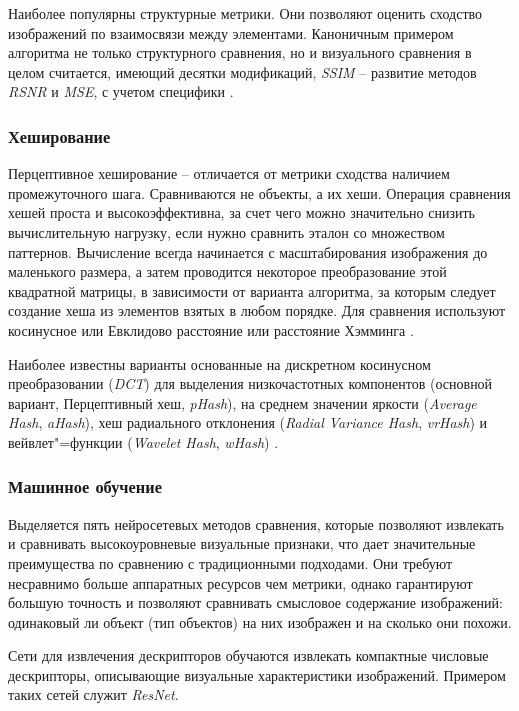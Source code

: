 Наиболее популярны структурные метрики. Они позволяют оценить сходство
изображений по взаимосвязи между элементами. Каноничным примером алгоритма не
только структурного сравнения, но и визуального сравнения в целом считается,
имеющий десятки модификаций, \textit{SSIM} -- развитие методов \textit{RSNR} и
\textit{MSE}, с учетом специфики 
\cite{wang2004image}.

\subsubsection{Хеширование}
Перцептивное хеширование -- отличается от метрики сходства наличием
промежуточного шага. Сравниваются не объекты, а их хеши. Операция сравнения
хешей проста и высокоэффективна, за счет чего можно значительно снизить
вычислительную нагрузку, если нужно сравнить эталон со множеством паттернов.
Вычисление всегда начинается с масштабирования изображения до маленького
размера, а затем проводится некоторое преобразование этой квадратной матрицы, в
зависимости от варианта алгоритма, за которым следует создание хеша из элементов
взятых в любом порядке. Для сравнения используют косинусное или Евклидово
расстояние или расстояние Хэмминга \cite{zauner2010implementation}.

Наиболее известны варианты основанные на дискретном косинусном преобразовании
(\textit{DCT}) для выделения низкочастотных компонентов (основной вариант,
Перцептивный хеш, \textit{pHash})\cite{zauner2010implementation}, на среднем
значении яркости (\textit{Average Hash}, \textit{aHash}), хеш радиального
отклонения (\textit{Radial Variance Hash}, \textit{vrHash}) и вейвлет"=функции
(\textit{Wavelet Hash}, \textit{wHash}) \cite{zauner2010implementation}.

\subsubsection{Машинное обучение}
Выделяется пять нейросетевых методов сравнения, которые позволяют извлекать и
сравнивать высокоуровневые визуальные признаки, что дает значительные
преимущества по сравнению с традиционными подходами. Они требуют несравнимо
больше аппаратных ресурсов чем метрики, однако гарантируют большую точность и
позволяют сравнивать смысловое содержание изображений: одинаковый ли объект (тип
объектов) на них изображен и на сколько они похожи.

Сети для извлечения дескрипторов обучаются извлекать компактные числовые
дескрипторы, описывающие визуальные характеристики изображений. Примером таких
сетей служит \textit{ResNet}\cite{simonyan2015deep}.

